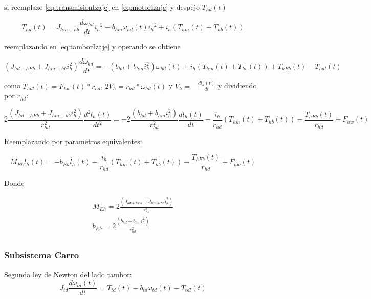 \documentclass{article}
\begin{document}
            si reemplazo \ref{eq:transmisionIzaje} en \ref{eq:motorIzaje} y despejo $T_{hd}(t)$

            \begin{equation} \label{eq:Thd}
                T_{hd}(t) = J_{hm+hb} \frac{d \omega_{hd}}{dt} {i_h}^2 - b_{hm} \omega_{hd}(t) {i_h}^2 + i_h (T_{hm}(t) + T_{hb}(t))
            \end{equation}

            reemplazando en \ref{eq:tamborIzaje} y operando se obtiene

            \begin{equation} \label{eq:izajeThdl}
                (J_{hd+hEb} + J_{hm+hb} i_h^2) \frac{d \omega_{hd}}{dt} = - (b_{hd} + b_{hm}i_h^2) \omega_{hd}(t) + i_h (T_{hm}(t) + T_{hb}(t)) + T_{hEb}(t) - T_{hdl}(t)
            \end{equation}

            como $T_{hdl}(t) = F_{hw}(t)*r_{hd}$, $2V_h = r_{hd}*\omega_{hd}(t)$ y $V_h = -\frac{dl_h(t)}{dt}$ y dividiendo por $r_{hd}$:

            \begin{equation} \label{eq:izajeFhw}
                2\frac{(J_{hd+hEb} + J_{hm+hb} i_h^2)}{r_{hd}^2} \frac{d^2 l_h(t)}{dt^2} = - 2\frac{(b_{hd} + b_{hm}i_h^2)}{r_{hd}^2} \frac{d l_h(t)}{dt} - \frac{i_h}{r_{hd}} (T_{hm}(t) + T_{hb}(t)) - \frac{T_{hEb}(t)}{r_{hd}} + F_{hw}(t)
            \end{equation}
            
            Reemplazando por parametros equivalentes:
            
            \begin{equation} \label{eq:izajeEquiv}
                M_{Eh} \ddot{l_h}(t) = - b_{Eh} \dot{l_h}(t) - \frac{i_h}{r_{hd}} (T_{hm}(t) + T_{hb}(t)) - \frac{T_{hEb}(t)}{r_{hd}} + F_{hw}(t)
            \end{equation}

            Donde

            \begin{align} \label{eq:izajeParamsEquiv}
                M_{Eh} = 2\frac{(J_{hd+hEb} + J_{hm+hb} i_h^2)}{r_{hd}^2}\\
                b_{Eh} = 2\frac{(b_{hd} + b_{hm}i_h^2)}{r_{hd}^2}\\
            \end{align}
            

        \subsubsection{Subsistema Carro}
            Segunda ley de Newton del lado tambor:
            \begin{equation} \label{eq:tamborCarro}
                J_{td} \frac{d \omega_{td}(t)}{dt} = T_{td}(t) - b_{td} \omega_{td}(t) - T_{tdl}(t)
            \end{equation}
\end{document}
